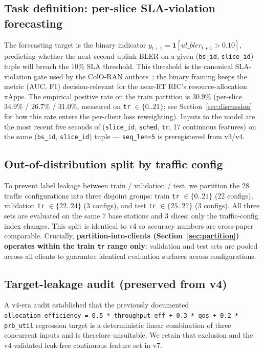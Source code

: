 \documentclass[journal]{IEEEtran}
\begin{document}
\subsection{Task definition: per-slice SLA-violation forecasting}

The forecasting target is the binary indicator $y_{t+1} = \mathbf{1}[\mathit{ul\_bler}_{t+1} > 0.10]$, predicting whether the next-second uplink BLER on a given (\lstinline|bs_id|, \lstinline|slice_id|) tuple will breach the $10\%$ SLA threshold. This threshold is the canonical SLA-violation gate used by the ColO-RAN authors~\cite{Polese2022}; the binary framing keeps the metric (AUC, F1) decision-relevant for the near-RT RIC's resource-allocation xApps. The empirical positive rate on the train partition is \textbf{$30.9\%$} (per-slice $34.9\%$ / $26.7\%$ / $31.0\%$, measured on \lstinline|tr| $\in\{0..21\}$; see Section~\ref{sec:discussion} for how this rate enters the per-client loss reweighting). Inputs to the model are the most recent five seconds of (\lstinline|slice_id|, \lstinline|sched|, \lstinline|tr|, 17 continuous features) on the same (\lstinline|bs_id|, \lstinline|slice_id|) tuple --- \lstinline|seq_len=5| is preregistered from v3/v4.

\subsection{Out-of-distribution split by traffic config}

To prevent label leakage between train / validation / test, we partition the 28 traffic configurations into three disjoint groups: train \lstinline|tr| $\in\{0..21\}$ (22 configs), validation \lstinline|tr| $\in\{22..24\}$ (3 configs), and test \lstinline|tr| $\in\{25..27\}$ (3 configs). All three sets are evaluated on the same 7 base stations and 3 slices; only the traffic-config index changes. This split is identical to v4 so accuracy numbers are cross-paper comparable. Crucially, \textbf{partition-into-clients (Section~\ref{sec:partition}) operates within the train \lstinline|tr| range only}: validation and test sets are pooled across all clients to guarantee identical evaluation surfaces across configurations.

\subsection{Target-leakage audit (preserved from v4)}

A v4-era audit established that the previously documented \lstinline|allocation_efficiency = 0.5 * throughput_eff + 0.3 * qos + 0.2 * prb_util| regression target is a deterministic linear combination of three concurrent inputs and is therefore unsuitable. We retain that exclusion and the v4-validated leak-free continuous feature set in v7.
\end{document}
